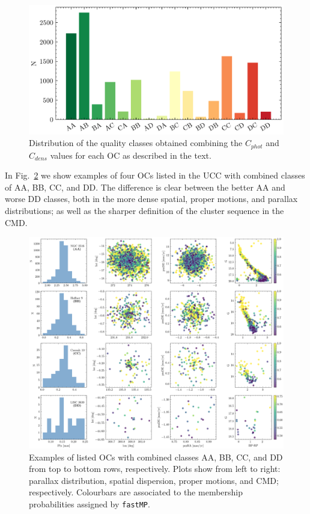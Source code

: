 \documentclass[fleqn,usenatbib]{mnras}
\begin{document}
\begin{figure}
	\includegraphics[width=\columnwidth]{figs/classif_bar.png}
    \caption{Distribution of the quality classes obtained combining the
    $C_{phot}$ and $C_{dens}$ values for each OC as described in the text.}
    \label{fig:classif_bar}
\end{figure}

In Fig.~\ref{fig:classif_examples} we show examples of four OCs listed in the
UCC with combined classes of AA, BB, CC, and DD. The difference is clear between
the better AA and worse DD classes, both in the more dense spatial, proper
motions, and parallax distributions; as well as the sharper definition of the
cluster sequence in the CMD.\\

\begin{figure}
	\includegraphics[width=\textwidth]{figs/clusters_classif.png}
    \caption{Examples of listed OCs with combined classes AA, BB, CC, and
    DD from top to bottom rows, respectively. Plots show from left to right:
    parallax distribution, spatial dispersion, proper motions, and CMD;
    respectively.
    Colourbars are associated to the membership probabilities assigned by 
    \texttt{fastMP}.}
    \label{fig:classif_examples}
\end{figure}
\end{document}
